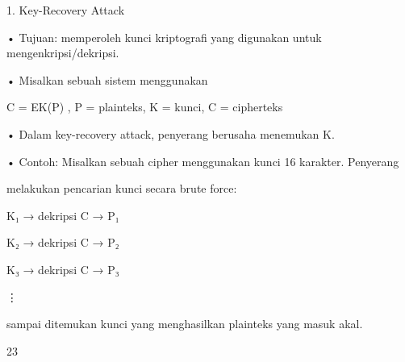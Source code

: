 \documentclass{article}
\begin{document}

1. Key-Recovery Attack

• Tujuan: memperoleh kunci kriptografi yang digunakan untuk mengenkripsi/dekripsi.

• Misalkan sebuah sistem menggunakan 

             C = EK(P)  ,     P = plainteks,  K = kunci,  C = cipherteks 

• Dalam key-recovery attack, penyerang berusaha menemukan K.

• Contoh: Misalkan sebuah cipher menggunakan kunci 16 karakter. Penyerang 

melakukan pencarian kunci secara brute force:

            K₁ → dekripsi C → P₁

            K₂ → dekripsi C → P₂

            K₃ → dekripsi C → P₃

               ⋮

   sampai ditemukan kunci yang menghasilkan plainteks yang masuk akal.

23
\end{document}
